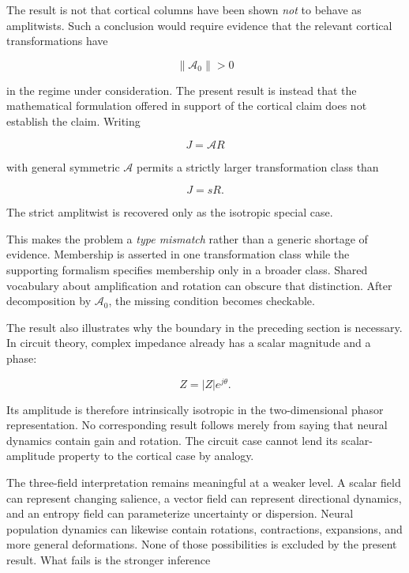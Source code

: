 \documentclass[11pt]{article}
\begin{document}
The result is not that cortical columns have been shown \emph{not} to behave as amplitwists. Such a conclusion would require evidence that the relevant cortical transformations have

\begin{equation}
\|\mathcal A_0\|>0
\end{equation}

in the regime under consideration. The present result is instead that the mathematical formulation offered in support of the cortical claim does not establish the claim. Writing

\begin{equation}
J=\mathcal A R
\end{equation}

with general symmetric $\mathcal A$ permits a strictly larger transformation class than

\begin{equation}
J=sR.
\end{equation}

The strict amplitwist is recovered only as the isotropic special case.

This makes the problem a \emph{type mismatch} rather than a generic shortage of evidence. Membership is asserted in one transformation class while the supporting formalism specifies membership only in a broader class. Shared vocabulary about amplification and rotation can obscure that distinction. After decomposition by $\mathcal A_0$, the missing condition becomes checkable.

The result also illustrates why the boundary in the preceding section is necessary. In circuit theory, complex impedance already has a scalar magnitude and a phase:

\begin{equation}
Z=|Z|e^{j\theta}.
\end{equation}

Its amplitude is therefore intrinsically isotropic in the two-dimensional phasor representation. No corresponding result follows merely from saying that neural dynamics contain gain and rotation. The circuit case cannot lend its scalar-amplitude property to the cortical case by analogy.

The three-field interpretation remains meaningful at a weaker level. A scalar field can represent changing salience, a vector field can represent directional dynamics, and an entropy field can parameterize uncertainty or dispersion. Neural population dynamics can likewise contain rotations, contractions, expansions, and more general deformations. None of those possibilities is excluded by the present result. What fails is the stronger inference
\end{document}
